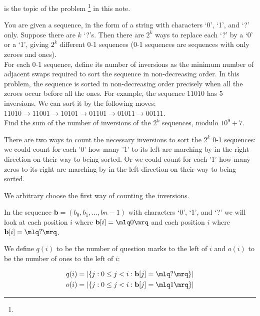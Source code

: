  is the topic of the problem \footnote{} in this note.

\begin{fullwidth}

\vspace{10 mm}
\begin{problem}
You are given a sequence, in the form of a string with characters `0', `1', and `?' only. Suppose there are $k$ `?'s. Then there are $2^k$ ways to replace each `?' by a `0' or a `1', giving $2 ^k$ different 0-1 sequences (0-1 sequences are sequences with only zeroes and ones).
\\
For each 0-1 sequence, define its number of inversions as the minimum number of adjacent swaps required to sort the sequence in non-decreasing order. In this problem, the sequence is sorted in non-decreasing order precisely when all the zeroes occur before all the ones. For example, the sequence $11010$ has $5$ inversions. We can sort it by the following moves: $11010 \rightarrow 11001 \rightarrow 10101 \rightarrow 01101 \rightarrow 01011 \rightarrow 00111$.
\\
Find the sum of the number of inversions of the $2^k$ sequences, $\text{modulo } 10^9+7$.
\end{problem}
\end{fullwidth}

There are two ways to count the necessary inversions to sort the $2^k$ 0-1 sequences: we could count for each '0' how many '1' to its left are marching by in the right direction on their way to being sorted. Or we could count for each '1' how many zeros to its right are marching by in the left direction on their way to being sorted.

We arbitrary choose the first way of counting the inversions.

In the sequence $\mathbf{b} = (b_0, b_1, \ldots, b{n-1})$ with characters `0', `1', and `?' we will look at each position $i$ where $\mathbf{b}[i] = \mlq0\mrq$ and each position $i$ where $\mathbf{b}[i] = \mlq?\mrq$.

We define $q(i)$ to be the number of question marks to the left of $i$ and $o(i)$ to be the number of ones to the left of $i$:

\begin{align*}
q(i) &= |\{j: 0 \leq j < i: \mathbf{b}[j] = \mlq?\mrq \}| \\
o(i) &= |\{j: 0 \leq j < i: \mathbf{b}[j] = \mlq1\mrq \}|
\end{align*}


